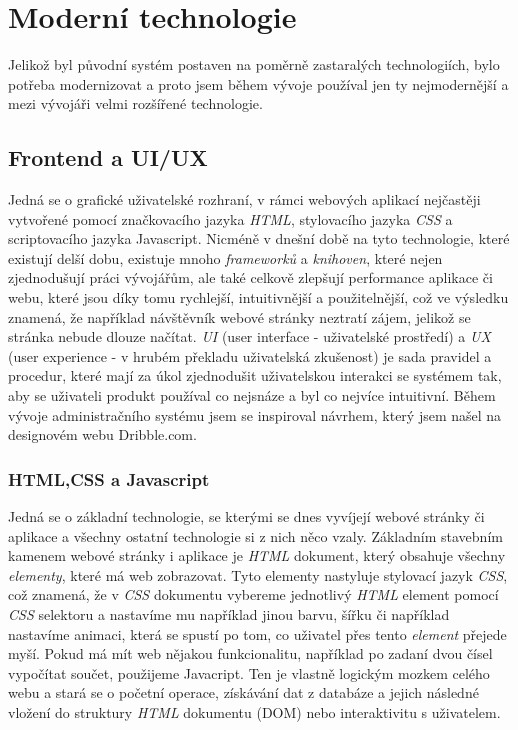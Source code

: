\documentclass[12pt,a4paper]{report}
\begin{document}
  \section{Moderní technologie}
  Jelikož byl původní systém postaven na poměrně zastaralých
  technologiích, bylo potřeba modernizovat a proto jsem během vývoje používal jen ty nejmodernější a
  mezi vývojáři velmi rozšířené technologie.
  \subsection{Frontend a UI/UX}
  Jedná se o grafické uživatelské rozhraní, v rámci webových aplikací nejčastěji vytvořené pomocí
  značkovacího jazyka \emph{HTML}, stylovacího jazyka \emph{CSS} a scriptovacího jazyka Javascript. Nicméně v
  dnešní době na tyto technologie, které existují delší dobu, existuje mnoho \emph{frameworků} a \emph{knihoven},
  které nejen zjednodušují práci vývojářům, ale také celkově zlepšují performance aplikace či webu,
  které jsou díky tomu rychlejší, intuitivnější a použitelnější, což ve výsledku znamená, že například
  návštěvník webové stránky neztratí zájem, jelikož se stránka nebude dlouze načítat.
  \emph{UI} (user interface - uživatelské prostředí) a \emph{UX} (user experience - v hrubém překladu uživatelská
  zkušenost) je sada pravidel a procedur, které mají za úkol zjednodušit uživatelskou interakci se
  systémem tak, aby se uživateli produkt používal co nejsnáze a byl co nejvíce intuitivní. Během
  vývoje administračního systému jsem se inspiroval návrhem, který jsem našel na designovém
  webu Dribble.com.
  \subsubsection{HTML,CSS a Javascript}
  Jedná se o základní technologie, se kterými se dnes vyvíjejí webové stránky či aplikace a všechny
  ostatní technologie si z nich něco vzaly.
  Základním stavebním kamenem webové stránky i aplikace je \emph{HTML} dokument, který obsahuje
  všechny \emph{elementy}, které má web zobrazovat.
  Tyto elementy nastyluje stylovací jazyk \emph{CSS}, což znamená, že v \emph{CSS} dokumentu vybereme
  jednotlivý \emph{HTML} element pomocí \emph{CSS} selektoru a nastavíme mu například jinou barvu, šířku či
  například nastavíme animaci, která se spustí po tom, co uživatel přes tento \emph{element} přejede myší.
  Pokud má mít web nějakou funkcionalitu, například po zadaní dvou čísel vypočítat součet,
  použijeme Javacript. Ten je vlastně logickým mozkem celého webu a stará se o početní
  operace, získávání dat z databáze a jejich následné vložení do struktury \emph{HTML} dokumentu (DOM)
  nebo interaktivitu s uživatelem.
\end{document}
